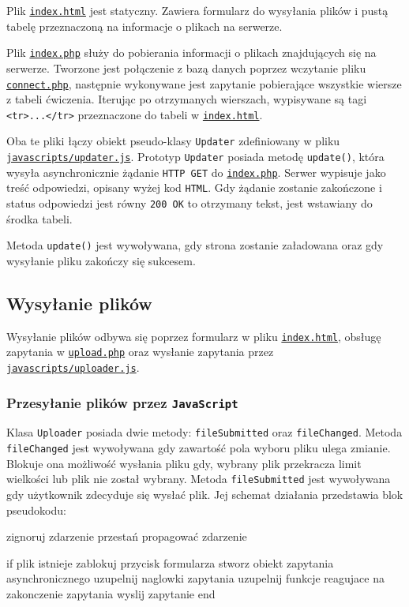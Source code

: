 \documentclass[10pt,a4paper]{article}
\newcommand{\f}[1]{\texttt{#1}}
\newcommand{\rev}{35c18ee3786b53133ca699f3f44c15e18e2d7a25}
\newcommand{\revhref}[1] {\href{https://github.com/student-tomasz/pi-cwiczenie-4/blob/\rev/#1}{\f{#1}}}
\begin{document}
Plik \revhref{index.html} jest statyczny. Zawiera formularz do wysyłania
plików i pustą tabelę przeznaczoną na informacje o plikach na serwerze.

Plik \revhref{index.php} służy do pobierania informacji o plikach znajdujących
się na serwerze. Tworzone jest połączenie z bazą danych poprzez wczytanie pliku
\revhref{connect.php}, następnie wykonywane jest zapytanie pobierające wszystkie
wiersze z tabeli ćwiczenia. Iterując po otrzymanych wierszach, wypisywane są
tagi \f{<tr>...</tr>} przeznaczone do tabeli w \revhref{index.html}.

Oba te pliki łączy obiekt pseudo-klasy \f{Updater} zdefiniowany w pliku
\revhref{javascripts/updater.js}. Prototyp \f{Updater} posiada metodę
\f{update()}, która wysyła asynchronicznie żądanie \f{HTTP GET} do
\revhref{index.php}. Serwer wypisuje jako treść odpowiedzi, opisany wyżej kod
\f{HTML}. Gdy żądanie zostanie zakończone i status odpowiedzi jest równy \f{200
OK} to otrzymany tekst, jest wstawiany do środka tabeli.

Metoda \f{update()} jest wywoływana, gdy strona zostanie załadowana oraz gdy
wysyłanie pliku zakończy się sukcesem.


\subsection{Wysyłanie plików}

Wysyłanie plików odbywa się poprzez formularz w pliku \revhref{index.html},
obsługę zapytania w \revhref{upload.php} oraz wysłanie zapytania przez
\revhref{javascripts/uploader.js}.

\subsubsection{Przesyłanie plików przez \f{JavaScript}}

Klasa \f{Uploader} posiada dwie metody: \f{fileSubmitted} oraz \f{fileChanged}.
Metoda \f{fileChanged} jest wywoływana gdy zawartość pola wyboru pliku ulega
zmianie. Blokuje ona możliwość wysłania pliku gdy, wybrany plik przekracza limit
wielkości lub plik nie został wybrany. Metoda \f{fileSubmitted} jest wywoływana
gdy użytkownik zdecyduje się wysłać plik. Jej schemat działania przedstawia blok
pseudokodu:

\begin{SmallVerbatim}
    zignoruj zdarzenie
    przestań propagować zdarzenie

    if plik istnieje
        zablokuj przycisk formularza
        stworz obiekt zapytania asynchronicznego
        uzupelnij naglowki zapytania
        uzupelnij funkcje reagujace na zakonczenie zapytania
        wyslij zapytanie
    end
\end{SmallVerbatim}
\end{document}
